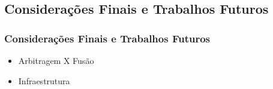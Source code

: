 \subsection{Considerações Finais e Trabalhos Futuros}
\begin{frame}
	\frametitle{Considerações Finais e Trabalhos Futuros}
	
	\begin{block}{}
		\begin{itemize}
		  \item Arbitragem X Fusão
		  \pause
		  \item Infraestrutura
		\end{itemize}
	\end{block}
\end{frame}